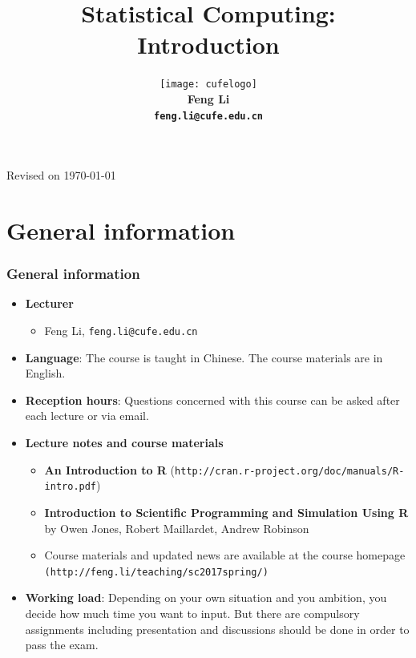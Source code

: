 \documentclass[10pt]{beamer}
\title[Statistical Computing]{{\textbf{Statistical Computing: Introduction}}}
\author[Feng Li]{\texttt{[image: cufelogo]}\\
  \vspace{0.5cm}\textbf{Feng Li\\\texttt{feng.li@cufe.edu.cn}}}
\date{}
\institute[Stat \& Math, CUFE]{\footnotesize{\textbf{School of Statistics and
      Mathematics\\ Central University of Finance and Economics}}}
\begin{document}
\begin{frame}[plain]
  \titlepage
  \tiny{Revised on \today}
\end{frame}


\section{General information}
\begin{frame}
  \frametitle{General information}
  \begin{itemize}

  \item \textbf{Lecturer}

    \begin{itemize}
    \item Feng Li, \texttt{feng.li@cufe.edu.cn}
    \end{itemize}
  \item \textbf{Language}: The course is taught in Chinese. The course
    materials are in English. %

  \item \textbf{Reception hours}: Questions concerned with this course can be
    asked after each lecture or via email.

  \item \textbf{Lecture notes and course materials}

    \begin{itemize}

    \item \textbf{An Introduction to R} (\texttt{http://cran.r-project.org/doc/manuals/R-intro.pdf})

    \item \textbf{Introduction to Scientific Programming and Simulation Using R} by Owen
      Jones, Robert Maillardet, Andrew Robinson


    \item Course materials and updated news are available at the course homepage
      \texttt{(http://feng.li/teaching/sc2017spring/)}

    \end{itemize}


  \item \textbf{Working load}: Depending on your own situation and you
    ambition, you decide how much time you want to input. But there are
    compulsory assignments including presentation and discussions should be
    done in order to pass the exam.

  \end{itemize}
\end{frame}
\end{document}
